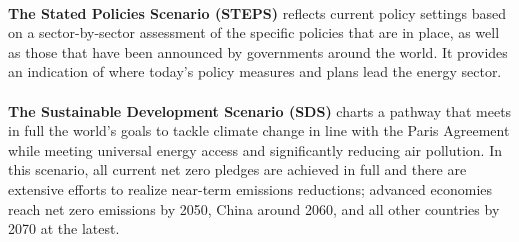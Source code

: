 \documentclass[../summary.tex]{subfiles}
\begin{document}
\\
\textbf{The Stated Policies Scenario (STEPS) }reflects current policy settings based on a sector-by-sector assessment of the specific policies that are in place, as well as those that have been announced by governments around the world. It provides an indication of where today’s policy measures and plans lead the energy sector.\\
\\
\textbf{The Sustainable Development Scenario (SDS) }charts a pathway that meets in full the world’s goals to tackle climate change in line with the Paris Agreement while meeting universal energy access and significantly reducing air pollution. In this scenario, all current net zero pledges are achieved in full and there are extensive efforts to realize near-term emissions reductions; advanced economies reach net zero emissions by 2050, China around 2060, and all other countries by 2070 at the latest.
\end{document}
